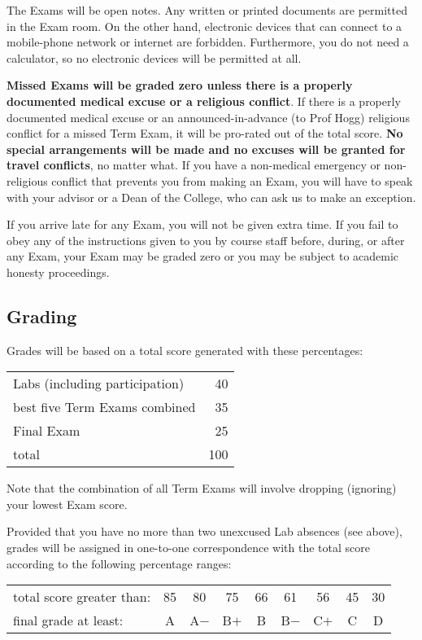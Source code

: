 \documentclass[12pt]{article}
\begin{document}
The Exams will be open notes. Any written or printed documents are
permitted in the Exam room. On the other hand, electronic devices that
can connect to a mobile-phone network or internet are
forbidden. Furthermore, you do not need a calculator, so no electronic
devices will be permitted at all.

\textbf{Missed Exams will be graded zero unless there is a properly
  documented medical excuse or a religious conflict}. If there is a
properly documented medical excuse or an announced-in-advance (to Prof
Hogg) religious conflict for a missed Term Exam, it will be pro-rated
out of the total score. \textbf{No special arrangements will be made
  and no excuses will be granted for travel conflicts}, no matter
what. If you have a non-medical emergency or non-religious conflict
that prevents you from making an Exam, you will have to speak with your
advisor or a Dean of the College, who can ask us to make an exception.

If you arrive late for any Exam, you will not be given extra time. If
you fail to obey any of the instructions given to you by course staff
before, during, or after any Exam, your Exam may be graded zero or you
may be subject to academic honesty proceedings.

\subsection*{Grading}

Grades will be based on a total score generated with these percentages:

\bigskip\noindent
\begin{tabular}{lr}
\hline
Labs (including participation) &  40 \\
best five Term Exams combined  &  35 \\
Final Exam                     &  25 \\
\hline
total                          & 100 \\
\hline
\end{tabular}

\bigskip\noindent
Note that the combination of all Term Exams will involve dropping
(ignoring) your lowest Exam score.

Provided that you have no more than two unexcused Lab absences (see
above), grades will be assigned in one-to-one correspondence with the
total score according to the following percentage ranges:

\bigskip\noindent
\begin{tabular}{lcccccccc}
\hline
total score greater than: & 85 & 80   & 75   & 66 & 61   & 56   & 45 & 30 \\
final grade at least:     & A  & A$-$ & B$+$ & B  & B$-$ & C$+$ & C  & D  \\
\hline
\end{tabular}
\end{document}
